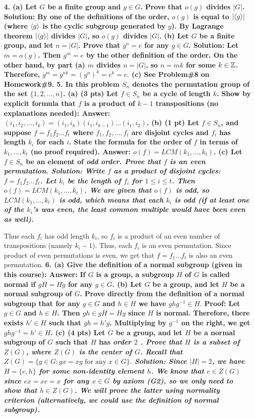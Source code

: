 \documentclass[12pt]{article}
\begin{document}
\bf{4. }\rm (a) Let $G$ be a finite group and $g\in G$.
Prove that $o(g)$ divides $|G|$.
\skv
{\bf Solution: } By one of the definitions of the order, $o(g)$ is equal to $|{\langle} g{\rangle}|$
(where ${\langle} g{\rangle}$ is the cyclic subgroup generated by $g$). By Lagrange
theorem $|{\langle} g{\rangle}|$ divides $|G|$, so $o(g)$ divides $|G|$.
\skv
(b) Let $G$ be a finite group, and let $n=|G|$. Prove that
$g^n=e$ for any $g\in G$.
\skv
{\bf Solution: } Let $m=o(g)$. Then $g^m=e$ by the other definition of the order.
On the other hand, by part (a) $m$ divides $n=|G|$, so $n=mk$ 
for some $k\in{\mathbb Z}$. Therefore,
$g^m=g^{nk}=(g^n)^k=e^k=e.$
\skv
(c) See Problem\#8 on Homework\#9.
\skv
\bf{5. }\rm In this problem $S_n$ denotes the permutation group
of the set $\{1,2,\ldots, n\}$.
\skv
(a) (3 pts) Let $f\in S_n$ be a cycle of length $k$. Show
by explicit formula that $f$ is a product of $k-1$ transpositions
(no explanations needed):
\skv
{\bf Answer: } $(i_1, i_2,\ldots, i_k) = (i_1, i_k) (i_1, i_{k-1})\ldots (i_1,i_2)$.
\skv
(b) (1 pt) Let $f\in S_n$, and suppose $f=f_1 f_2\ldots f_t$
where $f_1, f_2,\ldots, f_t$ are disjoint cycles and $f_i$ has length $k_i$
for each $i$. State the formula for the \bf{order }\rm of $f$ in terms of
$k_1,\ldots, k_t$ (no proof required).
\bf{Answer: }\rm $o(f)=LCM(k_1,\ldots, k_t)$.
\skv
(c) Let $f\in S_n$ be an element of \it{odd order. }\rm Prove that
$f$ is an \it{even permutation. }\rm
\skv
{\bf Solution: } Write $f$ as a product of disjoint cycles: $f=f_1 f_2\ldots f_t$.
Let $k_i$ be the length of $f_i$ for $1\leq i\leq t$.
Then $o(f)=LCM(k_1,\ldots, k_t)$.
\skv
We are given that $o(f)$ is odd, so $LCM(k_1,\ldots, k_t)$ is odd,
which means that each $k_i$ is odd (if at least one of the $k_i$'s
was even, the least common multiple would have been even as well).

Thus each $f_i$ has odd length $k_i$, so $f_i$ is a product of
an even number of transpositions (namely $k_i-1$). Thus, each $f_i$ 
is an even permutation. Since product of even permutations is even,
we get that $f=f_1\ldots f_t$ is also an even permutation.
\skv
\bf{6. }\rm (a) Give the definition of a normal subgroup (given in this course):
\skv
{\bf Answer: } If $G$ is a group, a subgroup $H$ of $G$ is called normal if 
$gH=Hg$ for any $g\in G$.
\skv
(b) Let $G$ be a group, and let $H$ be a normal subgroup of $G$.
Prove directly from the definition of a normal subgroup that for any $g\in G$
and $h\in H$ we have $ghg^{-1}\in H.$
\skv
{\bf Proof: } Let $g\in G$ and $h\in H$. Then $gh\in gH=Hg$ since $H$ is normal.
Therefore, there exists $h'\in H$ such that $gh=h'g$. Multiplying by $g^{-1}$
on the right, we get $ghg^{-1}=h'\in H$.
\skv
(c) (4 pts) Let $G$ be a group, and let $H$ be a normal subgroup of $G$
such that $H$ has \it{order $2$ }\rm. Prove that
$H$ is a subset of $Z(G)$, where $Z(G)$ is the center of $G$. Recall that
$Z(G)=\{g\in G: gx=xg \mbox{ for any }x\in G\}.$
\skv
{\bf Solution: } Since $|H|=2$, we have $H=\{e,h\}$ for some non-identity element $h$.
We know that $e\in Z(G)$ since $ex=xe=x$ for any $x\in G$ by axiom (G2),
so we only need to show that $h\in Z(G)$. We will prove the latter
using normality criterion (alternatively, we could use the definition of normal subgroup).
\end{document}
